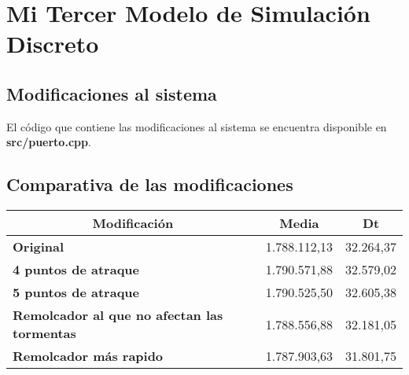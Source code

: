 \chapter{Mi Tercer Modelo de Simulación Discreto}

\section{Modificaciones al sistema}
El código que contiene las modificaciones al sistema se encuentra disponible en \textbf{src/puerto.cpp}.

\section{Comparativa de las modificaciones}
\begin{table}[H]
\centering
\begin{tabular}{|l|c|c|}
\hline
\multicolumn{1}{|c|}{\textbf{Modificación}} & \textbf{Media} & \textbf{Dt} \\ \hline
\textbf{Original} & 1.788.112,13 & 32.264,37 \\ \hline
\textbf{4 puntos de atraque} & 1.790.571,88 & 32.579,02 \\ \hline
\textbf{5 puntos de atraque} & 1.790.525,50 & 32.605,38 \\ \hline
\textbf{Remolcador al que no afectan las tormentas} & 1.788.556,88 & 32.181,05 \\ \hline
\textbf{Remolcador más rapido} & 1.787.903,63 & 31.801,75 \\ \hline
\end{tabular}
\end{table}
